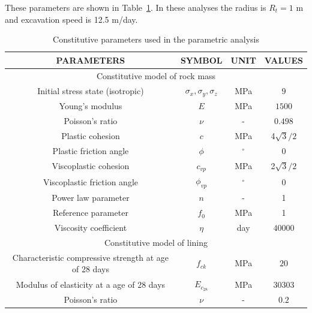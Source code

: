 \documentclass[a4paper,fleqn]{cas-sc}
\begin{document}
These parameters are shown in Table~\ref{table2}. In these analyses the radius is $R_t = 1$ m and excavation speed is 12.5 m/day.
\begin{table}
	\caption{Constitutive parameters used in the parametric analysis}
	\label{table2}
	\centering
	\renewcommand{\arraystretch}{1.25}
	\begin{tabular}{c c c c}
		\hline
		\multicolumn{1}{c}{PARAMETERS} &
		\multicolumn{1}{c}{SYMBOL} &
		\multicolumn{1}{c}{UNIT} &
		\multicolumn{1}{c}{VALUES} \\
		\hline
		\multicolumn{4}{c}{Constitutive model of rock mass} \\
		\hline
		Initial stress state (isotropic) & $\sigma_x, \sigma_y, \sigma_z$ & MPa & $9$ \\
		Young's modulus & $E$ & MPa & $1500$ \\
		Poisson's ratio & $\nu$ & - & $0.498$ \\
		Plastic cohesion & $c$ & MPa & 4$\sqrt{3}/2$ \\
		Plastic friction angle & $\phi$ & $^{\circ}$ & 0 \\
		Viscoplastic cohesion & $c_{vp}$ & MPa & 2$\sqrt{3}/2$ \\
		Viscoplastic friction angle & $\phi_{vp}$ & $^{\circ}$ & 0 \\
		Power law parameter & $n$ & - & 1 \\
		Reference parameter & $f_0$ & MPa & 1 \\
		Viscosity coefficient & $\eta$ & day & $40000$ \\
		\hline
		\multicolumn{4}{c}{Constitutive model of lining} \\
		\hline
		
		Characteristic compressive strength at age of 28 days & $f_{ck}$ & MPa & $20$ \\
		Modulus of elasticity at a age of 28 days & $E_{c_{28}}$ & MPa & $30303$ \\
		Poisson's ratio & $\nu$ & - & $0.2$ \\
		

\end{tabular}
\end{table}
\end{document}
